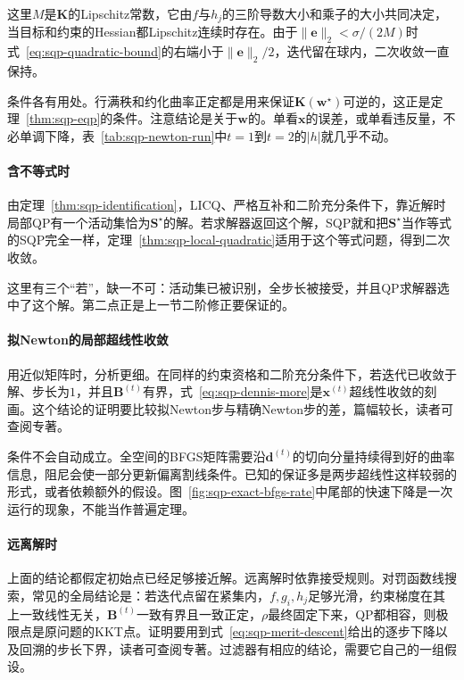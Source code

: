 这里$M$是$\bm{K}$的Lipschitz常数，它由$f$与$h_j$的三阶导数大小和乘子的大小共同决定，当目标和约束的Hessian都Lipschitz连续时存在。由于$\lVert\bm{e}\rVert_2<\sigma/(2M)$时式~\eqref{eq:sqp-quadratic-bound}的右端小于$\lVert\bm{e}\rVert_2/2$，迭代留在球内，二次收敛一直保持。

条件各有用处。行满秩和约化曲率正定都是用来保证$\bm{K}(\bm{w}^\star)$可逆的，这正是定理~\ref{thm:sqp-eqp}的条件。注意结论是关于$\bm{w}$的。单看$\bm{x}$的误差，或单看违反量，不必单调下降，表~\ref{tab:sqp-newton-run}中$t=1$到$t=2$的$\lvert h\rvert$就几乎不动。

\paragraph{含不等式时}
由定理~\ref{thm:sqp-identification}，LICQ、严格互补和二阶充分条件下，靠近解时局部QP有一个活动集恰为$\bm{S}^\star$的解。若求解器返回这个解，SQP就和把$\bm{S}^\star$当作等式的SQP完全一样，定理~\ref{thm:sqp-local-quadratic}适用于这个等式问题，得到二次收敛。

这里有三个“若”，缺一不可：活动集已被识别，全步长被接受，并且QP求解器选中了这个解。第二点正是上一节二阶修正要保证的。

\paragraph{拟Newton的局部超线性收敛}
用近似矩阵时，分析更细。在同样的约束资格和二阶充分条件下，若迭代已收敛于解、步长为$1$，并且$\bm{B}^{(t)}$有界，式~\eqref{eq:sqp-dennis-more}是$\bm{x}^{(t)}$超线性收敛的刻画。这个结论的证明要比较拟Newton步与精确Newton步的差，篇幅较长，读者可查阅专著。

条件不会自动成立。全空间的BFGS矩阵需要沿$\bm{d}^{(t)}$的切向分量持续得到好的曲率信息，阻尼会使一部分更新偏离割线条件。已知的保证多是两步超线性这样较弱的形式，或者依赖额外的假设。图~\ref{fig:sqp-exact-bfgs-rate}中尾部的快速下降是一次运行的现象，不能当作普遍定理。

\paragraph{远离解时}
上面的结论都假定初始点已经足够接近解。远离解时依靠接受规则。对罚函数线搜索，常见的全局结论是：若迭代点留在紧集内，$f,g_i,h_j$足够光滑，约束梯度在其上一致线性无关，$\bm{B}^{(t)}$一致有界且一致正定，$\rho$最终固定下来，QP都相容，则极限点是原问题的KKT点。证明要用到式~\eqref{eq:sqp-merit-descent}给出的逐步下降以及回溯的步长下界，读者可查阅专著。过滤器有相应的结论，需要它自己的一组假设。

